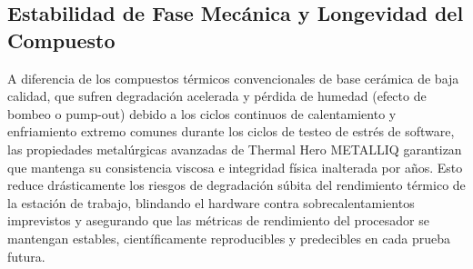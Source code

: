 \documentclass[12pt,a4paper]{article}
\begin{document}
\subsection{Estabilidad de Fase Mecánica y Longevidad del Compuesto}
A diferencia de los compuestos térmicos convencionales de base cerámica de baja calidad, que sufren degradación acelerada y pérdida de humedad (efecto de bombeo o pump-out) debido a los ciclos continuos de calentamiento y enfriamiento extremo comunes durante los ciclos de testeo de estrés de software, las propiedades metalúrgicas avanzadas de Thermal Hero METALLIQ garantizan que mantenga su consistencia viscosa e integridad física inalterada por años. Esto reduce drásticamente los riesgos de degradación súbita del rendimiento térmico de la estación de trabajo, blindando el hardware contra sobrecalentamientos imprevistos y asegurando que las métricas de rendimiento del procesador se mantengan estables, científicamente reproducibles y predecibles en cada prueba futura.
\end{document}
